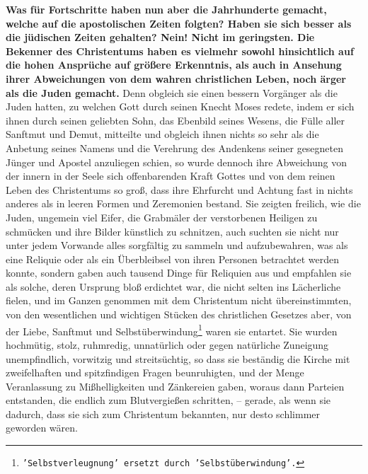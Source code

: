 \label{ref:07_14_vortschritt}
\textbf{Was für Fortschritte haben nun aber die
Jahrhunderte gemacht, welche auf die
apostolischen Zeiten folgten? Haben sie sich besser als die jüdischen Zeiten
gehalten? Nein! Nicht im geringsten. Die Bekenner des Christentums haben es
vielmehr sowohl hinsichtlich auf die hohen Ansprüche auf größere Erkenntnis, als
auch in Ansehung ihrer Abweichungen von dem wahren christlichen Leben, noch
ärger als die Juden gemacht.} Denn obgleich sie einen
bessern Vorgänger als die
Juden hatten, zu welchen Gott durch seinen Knecht Moses
redete, indem er sich
ihnen durch seinen geliebten Sohn, das Ebenbild seines Wesens, die Fülle aller
Sanftmut und Demut, mitteilte und obgleich ihnen nichts so sehr als die
Anbetung seines Namens und die Verehrung des Andenkens seiner gesegneten Jünger
und Apostel anzuliegen schien, so wurde dennoch ihre Abweichung von der innern
in der Seele sich offenbarenden Kraft Gottes und von dem reinen Leben des
Christentums so groß, dass ihre Ehrfurcht und Achtung fast in nichts anderes
als in leeren Formen und Zeremonien bestand. Sie zeigten freilich, wie die
Juden, ungemein viel Eifer, die Grabmäler der verstorbenen Heiligen
 zu schmücken
und ihre Bilder künstlich zu schnitzen, auch suchten sie nicht nur unter jedem
Vorwande alles sorgfältig zu sammeln und aufzubewahren, was als eine Reliquie
oder als ein Überbleibsel von ihren Personen betrachtet werden konnte, sondern
gaben auch tausend Dinge für Reliquien aus und empfahlen sie als solche, deren
Ursprung bloß erdichtet war, die nicht selten ins Lächerliche fielen, und im
Ganzen genommen mit dem Christentum nicht übereinstimmten, von den
wesentlichen und wichtigen Stücken des christlichen Gesetzes aber, von der
Liebe, Sanftmut und Selbstüberwindung\footnote{\texttt{'Selbstverleugnung'
ersetzt durch 'Selbstüberwindung'.}} waren sie entartet. Sie wurden
hochmütig, stolz, ruhmredig, unnatürlich oder gegen natürliche Zuneigung
unempfindlich, vorwitzig und streitsüchtig, so dass sie beständig die Kirche mit
zweifelhaften und spitzfindigen Fragen beunruhigten, und
der Menge Veranlassung
zu Mißhelligkeiten und Zänkereien gaben, woraus dann Parteien entstanden, die
endlich zum Blutvergießen
schritten, --
gerade, als wenn sie dadurch, dass sie
sich zum Christentum bekannten, nur desto schlimmer geworden wären.

\medskip

